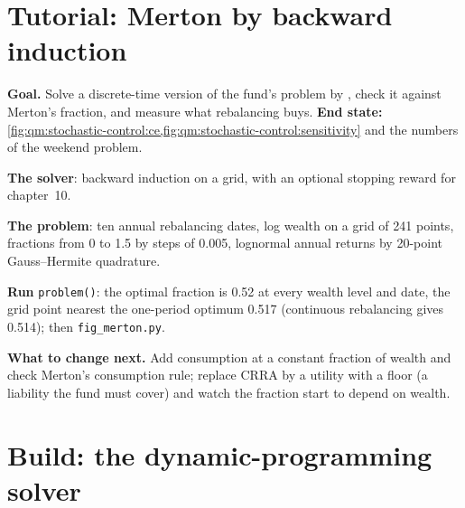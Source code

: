 \section{Tutorial: Merton by backward induction}\label{tut:qm:stochastic-control:merton}

\begin{tutorial}
\textbf{Goal.} Solve a discrete-time version of the fund's problem by , check it against
Merton's fraction, and measure what rebalancing buys. \textbf{End state:}
\cref{fig:qm:stochastic-control:ce,fig:qm:stochastic-control:sensitivity} and the numbers of the weekend problem.
\begin{tutsteps}
\item \textbf{The solver}: backward induction on a grid, with an optional stopping reward for chapter~10.
\label{lst:qm:stochastic-control:dp}
\item \textbf{The problem}: ten annual rebalancing dates, log wealth on a grid of 241 points, fractions from 0 to 1.5
by steps of 0.005, lognormal annual returns by 20-point Gauss--Hermite quadrature.
\label{lst:qm:stochastic-control:merton}
\item \textbf{Run} \texttt{problem()}: the optimal fraction is 0.52 at every wealth level and date, the grid point
nearest the one-period optimum 0.517 (continuous rebalancing gives 0.514); then \texttt{fig\_merton.py}.
\end{tutsteps}
\textbf{What to change next.} Add consumption at a constant fraction of wealth and check Merton's consumption rule;
replace CRRA by a utility with a floor (a liability the fund must cover) and watch the fraction start to depend on
wealth.
\end{tutorial}

\section{Build: the dynamic-programming solver}\label{bld:qm:stochastic-control:dpsolve}

